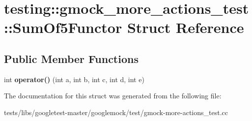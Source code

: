 \hypertarget{structtesting_1_1gmock__more__actions__test_1_1SumOf5Functor}{}\section{testing\+:\+:gmock\+\_\+more\+\_\+actions\+\_\+test\+:\+:Sum\+Of5\+Functor Struct Reference}
\label{structtesting_1_1gmock__more__actions__test_1_1SumOf5Functor}
\subsection*{Public Member Functions}
\begin{DoxyCompactItemize}
\item 
\mbox{\label{structtesting_1_1gmock__more__actions__test_1_1SumOf5Functor_ab7c80522ca7401c89e86eecb03fe1fbb}} 
int {\bfseries operator()} (int a, int b, int c, int d, int e)
\end{DoxyCompactItemize}


The documentation for this struct was generated from the following file\+:\begin{DoxyCompactItemize}
\item 
tests/libs/googletest-\/master/googlemock/test/gmock-\/more-\/actions\+\_\+test.\+cc\end{DoxyCompactItemize}
